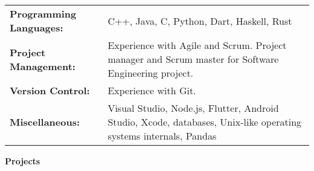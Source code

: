 \documentclass[a4paper]{article}
\newcommand{\lineunder} {
    \vspace*{-8pt} \\
    \hspace*{-18pt} \hrulefill \\
}
\newcommand{\header} [1] {
    {\hspace*{-18pt}\vspace*{6pt}\LARGE \textbf{#1}}
    \vspace*{-6pt} \lineunder
}
\begin{document}
\def\arraystretch{1.25}
\begin{tabular}{ l p{.69\linewidth} }
	\hspace*{-3.28mm} \textbf{Programming Languages:} & C++, Java, C, Python, Dart, Haskell, Rust                                                                                \\
	\hspace*{-3.28mm} \textbf{Project Management:}   & Experience with Agile and Scrum. Project manager and Scrum master for Software Engineering project. \\
	\hspace*{-3.28mm} \textbf{Version Control:}       & Experience with Git.\\
    \hspace*{-3.28mm} \textbf{Miscellaneous:}       & Visual Studio, Node.js, Flutter, Android Studio, Xcode, databases, Unix-like operating systems internals, Pandas                                                                                            \\
\end{tabular}
\vspace{2mm}

\header{Projects}
\vspace{1mm}


\end{document}

